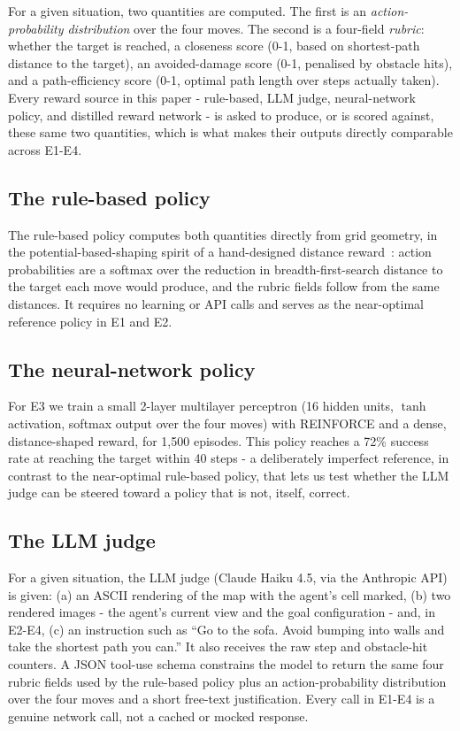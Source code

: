 \documentclass[conference]{IEEEtran}
\begin{document}
For a given situation, two quantities are computed. The first is an
\emph{action-probability distribution} over the four moves. The second
is a four-field \emph{rubric}: whether the target is reached, a
closeness score (0-1, based on shortest-path distance to the target), an
avoided-damage score (0-1, penalised by obstacle hits), and a
path-efficiency score (0-1, optimal path length over steps actually
taken). Every reward source in this paper - rule-based, LLM judge,
neural-network policy, and distilled reward network - is asked to
produce, or is scored against, these same two quantities, which is what
makes their outputs directly comparable across E1-E4.

\subsection{The rule-based policy}
\label{subsec:rule}

The rule-based policy computes both quantities directly from grid
geometry, in the potential-based-shaping spirit of a hand-designed
distance reward~\cite{ng1999shaping}: action probabilities are a
softmax over the reduction in breadth-first-search distance to the
target each move would produce, and the rubric fields follow from the
same distances. It requires no learning or API calls and serves as the
near-optimal reference policy in E1 and E2.

\subsection{The neural-network policy}
\label{subsec:nn}

For E3 we train a small 2-layer multilayer perceptron (16 hidden units,
$\tanh$ activation, softmax output over the four moves) with REINFORCE
and a dense, distance-shaped reward, for 1{,}500 episodes. This policy
reaches a 72\% success rate at reaching the target within 40 steps - a
deliberately imperfect reference, in contrast to the near-optimal
rule-based policy, that lets us test whether the LLM judge can be
steered toward a policy that is not, itself, correct.

\subsection{The LLM judge}
\label{subsec:judge}

For a given situation, the LLM judge (Claude Haiku 4.5, via the
Anthropic API) is given: (a) an ASCII rendering of the map with the
agent's cell marked, (b) two rendered images - the agent's current view
and the goal configuration - and, in E2-E4, (c) an instruction such as
``Go to the sofa. Avoid bumping into walls and take the shortest path
you can.'' It also receives the raw step and obstacle-hit counters. A
JSON tool-use schema constrains the model to return the same four
rubric fields used by the rule-based policy plus an action-probability
distribution over the four moves and a short free-text justification.
Every call in E1-E4 is a genuine network call, not a cached or mocked
response.
\end{document}
